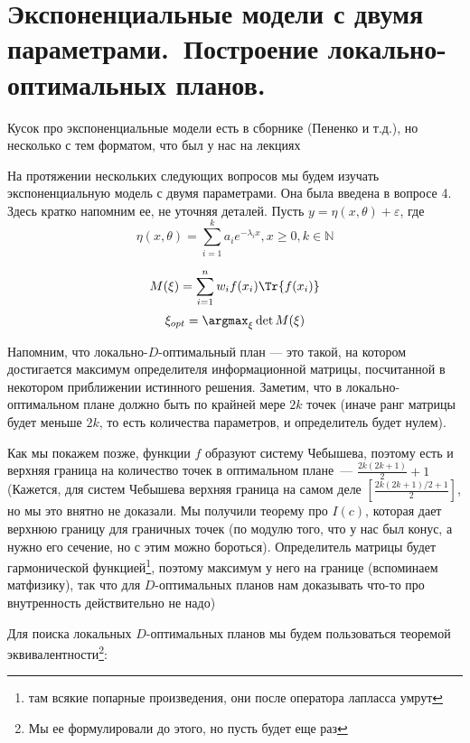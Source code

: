 \section{Экспоненциальные модели с двумя параметрами. Построение локально-оптимальных планов.}

{\color{blue} Кусок про экспоненциальные модели есть в сборнике (Пененко и т.д.), но несколько  с тем форматом, что был у нас на лекциях}

На протяжении нескольких следующих вопросов мы будем изучать экспоненциальную модель с двумя параметрами.
Она была введена в вопросе 4. Здесь кратко напомним ее, не уточняя деталей.
Пусть $y = \eta(x, \theta) + \varepsilon$, где 
$$\eta(x,\theta) = \sum\limits_{i=1}^{k} a_i e^{-\lambda_ix}, x \ge 0, k \in \mathbb{N}$$

$$M(\xi) = \sum \limits_{i=1}^{n} w_if(x_i)\Tr{f(x_i)}$$
$$\xi_{opt} = \argmax_{\xi} \det M(\xi)$$

Напомним, что локально-$D$-оптимальный план --- это такой, на котором достигается максимум определителя информационной матрицы, посчитанной в некотором приближении истинного решения.
Заметим, что в локально-оптимальном плане должно быть по крайней мере $2k$ точек (иначе ранг матрицы будет меньше $2k$, то есть количества параметров, и определитель будет нулем). 

Как мы покажем позже, функции $f$ образуют систему Чебышева, поэтому есть и верхняя граница на количество точек в оптимальном плане — $\frac{2k(2k+1)}{2}+1$ (Кажется, для систем Чебышева верхняя граница на самом деле $[\frac{2k(2k+1)/2 + 1}{2}]$, но мы это внятно не доказали. Мы получили теорему про $I(c)$, которая дает верхнюю границу для граничных точек (по модулю того, что у нас был конус, а нужно его сечение, но с этим можно бороться). Определитель матрицы будет гармонической функцией\footnote{там всякие попарные произведения, они после оператора лапласса умрут}, поэтому максимум у него на границе (вспоминаем матфизику), так что для $D$-оптимальных планов нам доказывать что-то про внутренность действительно не надо)


Для поиска локальных $D$-оптимальных планов мы будем пользоваться теоремой эквивалентности\footnote{Мы ее формулировали до этого, но пусть будет еще раз}:

